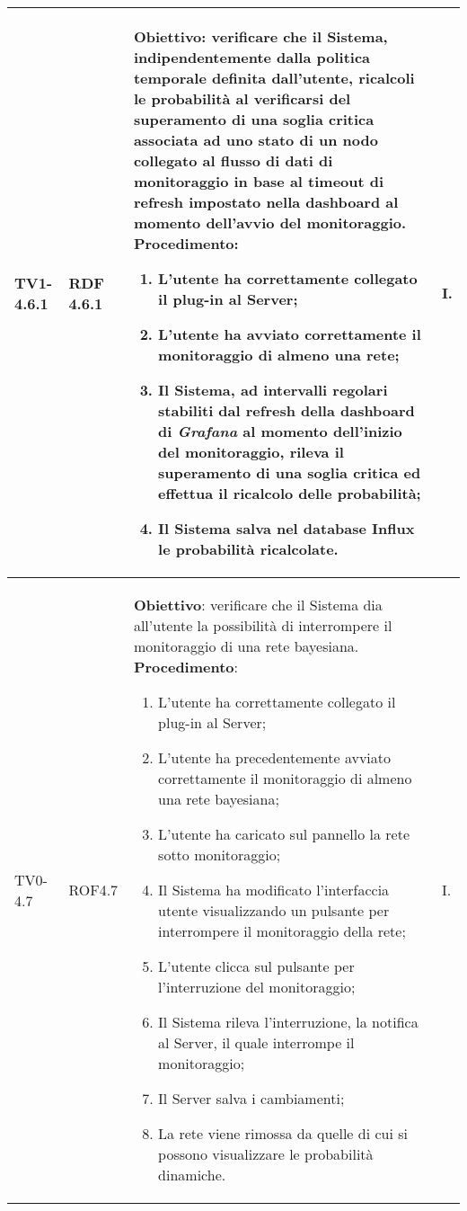 \begin{longtable}{|C{.15\textwidth}|C{.13\textwidth}|m{.52\textwidth}|C{.08\textwidth}|}
TV1-4.6.1 & RDF 4.6.1 &
	\textbf{Obiettivo}: verificare che il Sistema, indipendentemente dalla politica temporale definita dall'utente, ricalcoli le probabilità al verificarsi del superamento di una soglia critica associata ad uno stato di un nodo collegato al flusso di dati di monitoraggio in base al timeout di refresh impostato nella dashboard al momento dell'avvio del monitoraggio. \newline
	\textbf{Procedimento}:
	\begin{enumerate}
		\item L'utente ha correttamente collegato il plug-in al Server;
		\item L'utente ha avviato correttamente il monitoraggio di almeno una rete;
		\item Il Sistema, ad intervalli regolari stabiliti dal refresh della dashboard di \textit{Grafana} al momento dell'inizio del monitoraggio, rileva il superamento di una soglia critica ed effettua il ricalcolo delle probabilità;
		\item Il Sistema salva nel database Influx le probabilità ricalcolate.
	\end{enumerate}
	& I. \\
\hline

TV0-4.7 & ROF4.7 &
	\textbf{Obiettivo}: verificare che il Sistema dia all'utente la possibilità di interrompere il monitoraggio di una rete bayesiana. \newline
	\textbf{Procedimento}:
	\begin{enumerate}
		\item L'utente ha correttamente collegato il plug-in al Server;
		\item L'utente ha precedentemente avviato correttamente il monitoraggio di almeno una rete bayesiana;
		\item L'utente ha caricato sul pannello la rete sotto monitoraggio;
		\item Il Sistema ha modificato l'interfaccia utente visualizzando un pulsante per interrompere il monitoraggio della rete;
		\item L'utente clicca sul pulsante per l'interruzione del monitoraggio;
		\item Il Sistema rileva l'interruzione, la notifica al Server, il quale interrompe il monitoraggio;
		\item Il Server salva i cambiamenti;
		\item La rete viene rimossa da quelle di cui si possono visualizzare le probabilità dinamiche.
	\end{enumerate}
	& I. \\
\hline


\end{longtable}
